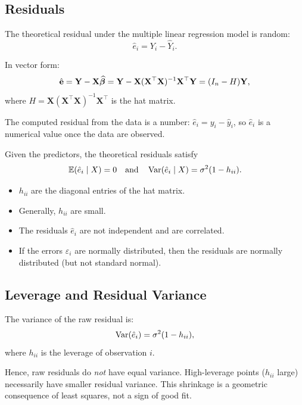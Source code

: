 \subsection{Residuals}

The theoretical residual under the multiple linear regression model is random:
\[
\hat{e}_i = Y_i - \hat{Y}_i.
\]

In vector form:
\[
\hat{\mathbf{e}}
= \mathbf{Y} - \mathbf{X}\widehat{\boldsymbol{\beta}}
= \mathbf{Y} - \mathbf{X}(\mathbf{X}^\top \mathbf{X})^{-1}\mathbf{X}^\top \mathbf{Y}
= (I_n - H)\mathbf{Y},
\]
where $H = \mathbf{X}(\mathbf{X}^\top \mathbf{X})^{-1}\mathbf{X}^\top$ is the hat matrix.

\begin{notebox}
The computed residual from the data is a number: $\hat{e}_i = y_i - \hat{y}_i$, so $\hat{e}_i$ is a numerical value once the data are observed.
\end{notebox}

Given the predictors, the theoretical residuals satisfy
\[
\mathbb{E}(\hat{e}_i \mid X) = 0
\quad \text{and} \quad
\operatorname{Var}(\hat{e}_i \mid X) = \sigma^2 (1 - h_{ii}).
\]

\begin{itemize}
  \item $h_{ii}$ are the diagonal entries of the hat matrix.
  \item Generally, $h_{ii}$ are small.
  \item The residuals $\hat{e}_i$ are not independent and are correlated.
  \item If the errors $\varepsilon_i$ are normally distributed, then the residuals are normally distributed (but not standard normal).
\end{itemize}

\subsection{Leverage and Residual Variance}

\begin{notebox}
The variance of the raw residual is:
\[
\operatorname{Var}(\hat{e}_i) = \sigma^2(1 - h_{ii}),
\]
where $h_{ii}$ is the leverage of observation $i$.

Hence, raw residuals do \emph{not} have equal variance. High-leverage points ($h_{ii}$ large) necessarily have smaller residual variance. This shrinkage is a geometric consequence of least squares, not a sign of good fit.
\end{notebox}

